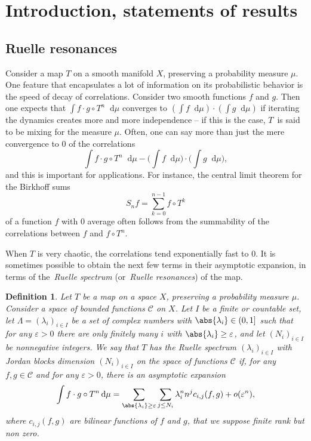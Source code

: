 \documentclass[JEP,XML,SOM,Unicode]{cedram}
\newcommand{\boC}{\mathcal{C}}
\newcommand{\dd}{\mathop{}\!\mathrm{d}}
\let\epsilon\varepsilon
\newtheorem{definition}[thm]{Definition}
\theoremstyle{definition}
\numberwithin{equation}{section}
\begin{document}
\maketitle
\tableofcontents


\section{Introduction, statements of results}

\subsection*{Ruelle resonances} Consider a map $T$ on a smooth manifold
$X$, preserving a probability measure $\mu$. One feature that encapsulates a
lot of information on its probabilistic behavior is the speed of decay of
correlations. Consider two smooth functions $f$ and $g$. Then one expects
that $\int f \cdot g \circ T^n \dd \mu$ converges to $(\int f \dd\mu) \cdot
(\int g \dd\mu)$ if iterating the dynamics creates more and more independence
-- if this is the case, $T$~is said to be mixing for the measure $\mu$.
Often, one can say more than just the mere convergence to $0$ of the
correlations
\[
\int f \cdot g \circ T^n \dd \mu - \biggl(\int f \dd\mu\biggr) \cdot \biggl(\int
g \dd\mu\biggr),
\]
and this is important for applications. For instance, the central
limit theorem for the Birkhoff sums
\[
S_n f = \sum_{k=0}^{n-1} f \circ T^k
\]
of
a function $f$ with $0$ average often follows from the summability of the
correlations between $f$ and $f\circ T^n$.

When $T$ is very chaotic, the correlations tend exponentially fast to $0$. It
is sometimes possible to obtain the next few terms in their asymptotic
expansion, in terms of the~\emph{Ruelle spectrum} (or~\emph{Ruelle
resonances}) of the map.

\begin{definition}
\label{defn:Ruelle_spectrum} Let $T$ be a map on a space $X$, preserving a
probability measure $\mu$. Consider a space of bounded functions $\boC$ on
$X$. Let $I$ be a finite or countable set, let $\Lambda = (\lambda_i)_{i \in
I}$ be a set of complex numbers with $\abs{\lambda_i} \in (0,1]$ such that
for any $\epsilon>0$ there are only finitely many $i$ with $\abs{\lambda_i}
\geq \epsilon$, and let $(N_i)_{i\in I}$ be nonnegative integers. We say that
$T$ has the Ruelle spectrum $(\lambda_i)_{i \in I}$ with Jordan blocks
dimension $(N_i)_{i\in I}$ on the space of functions $\boC$ if, for any $f, g
\in \boC$ and for any $\epsilon>0$, there is an asymptotic expansion
\begin{equation*}
\int f \cdot g \circ T^n \dd\mu = \sum_{\abs{\lambda_i} \geq \epsilon} \sum_{j\leq N_i} \lambda_i^n n^j c_{i,j}(f,g)
+ o(\epsilon^n),
\end{equation*}
where $c_{i,j}(f,g)$ are bilinear functions of $f$ and $g$, that we suppose finite rank but non zero.
\end{definition}
\end{document}
